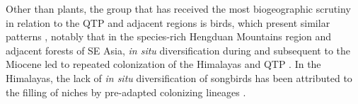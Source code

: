 


Other than plants, the group that has received the most biogeographic
scrutiny in relation to the QTP and adjacent regions is birds, which
present similar patterns \citep[see][]{packert2015}, notably that in
the species-rich Hengduan Mountains region and adjacent forests of SE
Asia, \textit{in situ} diversification during and subsequent to the
Miocene led to repeated colonization of the Himalayas and QTP
\citep[e.g.,][]{liu2016,tietze2013,johansson2007}. In the Himalayas,
the lack of \textit{in situ} diversification of songbirds has been
attributed to the filling of niches by pre-adapted colonizing lineages
\citep{price2014}.




